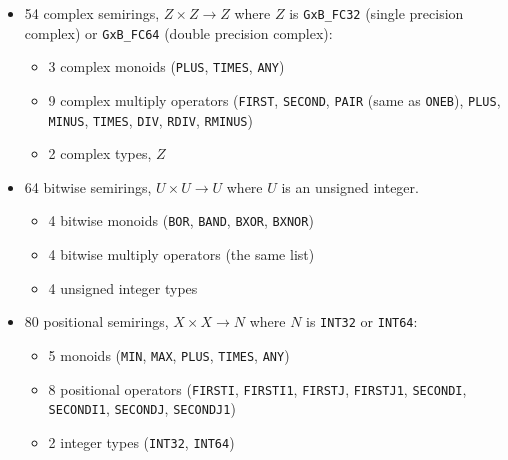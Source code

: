 \documentclass[12pt]{article}
\begin{document}
\begin{itemize}
\item 54 complex semirings, $Z \times Z \rightarrow Z$ where $Z$ is
    \verb'GxB_FC32' (single precision complex) or
    \verb'GxB_FC64' (double precision complex):

    \vspace{-0.05in}
    \begin{itemize}
    \item 3 complex monoids (\verb'PLUS', \verb'TIMES', \verb'ANY')
    \item 9 complex multiply operators
        (\verb'FIRST', \verb'SECOND', \verb'PAIR' (same as \verb'ONEB'),
        \verb'PLUS', \verb'MINUS',
            \verb'TIMES', \verb'DIV', \verb'RDIV', \verb'RMINUS')
    \item 2 complex types, $Z$
    \end{itemize}

\item 64 bitwise semirings, $U \times U \rightarrow U$ where $U$ is
    an unsigned integer.

    \vspace{-0.05in}
    \begin{itemize}
    \item 4 bitwise monoids (\verb'BOR', \verb'BAND', \verb'BXOR', \verb'BXNOR')
    \item 4 bitwise multiply operators (the same list)
    \item 4 unsigned integer types
    \end{itemize}

\item 80 positional semirings, $X \times X \rightarrow N$ where $N$ is
    \verb'INT32' or \verb'INT64':

    \vspace{-0.05in}
    \begin{itemize}
    \item 5 monoids (\verb'MIN', \verb'MAX', \verb'PLUS', \verb'TIMES', \verb'ANY')
    \item 8 positional operators
        (\verb'FIRSTI', \verb'FIRSTI1', \verb'FIRSTJ', \verb'FIRSTJ1',
        \verb'SECONDI', \verb'SECONDI1', \verb'SECONDJ', \verb'SECONDJ1')
    \item 2 integer types (\verb'INT32', \verb'INT64')
    \end{itemize}

\end{itemize}

\end{document}
